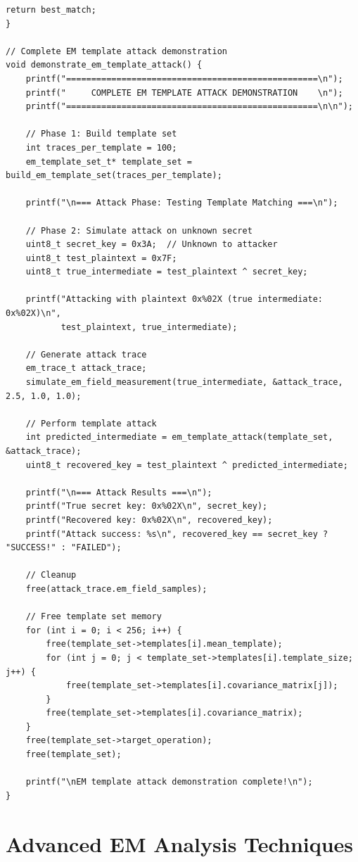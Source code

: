 \documentclass[11pt,a4paper]{article}
\theoremstyle{definition}
\begin{document}
\begin{lstlisting}[caption={Complete EM Template Building Implementation}]
    return best_match;
}

// Complete EM template attack demonstration
void demonstrate_em_template_attack() {
    printf("==================================================\n");
    printf("     COMPLETE EM TEMPLATE ATTACK DEMONSTRATION    \n");
    printf("==================================================\n\n");
    
    // Phase 1: Build template set
    int traces_per_template = 100;
    em_template_set_t* template_set = build_em_template_set(traces_per_template);
    
    printf("\n=== Attack Phase: Testing Template Matching ===\n");
    
    // Phase 2: Simulate attack on unknown secret
    uint8_t secret_key = 0x3A;  // Unknown to attacker
    uint8_t test_plaintext = 0x7F;
    uint8_t true_intermediate = test_plaintext ^ secret_key;
    
    printf("Attacking with plaintext 0x%02X (true intermediate: 0x%02X)\n", 
           test_plaintext, true_intermediate);
    
    // Generate attack trace
    em_trace_t attack_trace;
    simulate_em_field_measurement(true_intermediate, &attack_trace, 2.5, 1.0, 1.0);
    
    // Perform template attack
    int predicted_intermediate = em_template_attack(template_set, &attack_trace);
    uint8_t recovered_key = test_plaintext ^ predicted_intermediate;
    
    printf("\n=== Attack Results ===\n");
    printf("True secret key: 0x%02X\n", secret_key);
    printf("Recovered key: 0x%02X\n", recovered_key);
    printf("Attack success: %s\n", recovered_key == secret_key ? "SUCCESS!" : "FAILED");
    
    // Cleanup
    free(attack_trace.em_field_samples);
    
    // Free template set memory
    for (int i = 0; i < 256; i++) {
        free(template_set->templates[i].mean_template);
        for (int j = 0; j < template_set->templates[i].template_size; j++) {
            free(template_set->templates[i].covariance_matrix[j]);
        }
        free(template_set->templates[i].covariance_matrix);
    }
    free(template_set->target_operation);
    free(template_set);
    
    printf("\nEM template attack demonstration complete!\n");
}
\end{lstlisting}

\section{Advanced EM Analysis Techniques}
\end{document}
